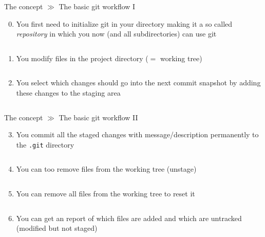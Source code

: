 \documentclass[10pt]{beamer}
\begin{document}
\begin{frame}{The concept $\gg$ The basic git workflow I}
	\begin{enumerate}\setcounter{enumi}{-1}
		\item You first need to initialize git in your directory making it a so called \textit{repository} in which you now (and all subdirectories) can use git
		\inputminted[bgcolor=lightGreyCustom,fontsize=\scriptsize]{sh}{./resources/git_workflow_00_init.sh}
		\item You modify files in the project directory ($=$ working tree)
		\inputminted[bgcolor=lightGreyCustom,fontsize=\scriptsize]{sh}{./resources/git_workflow_01_modify.sh}
		\item You select which changes should go into the next commit snapshot by adding these changes to the staging area
		\inputminted[bgcolor=lightGreyCustom,fontsize=\scriptsize]{sh}{./resources/git_workflow_02_stage.sh}
	\end{enumerate}
\end{frame}

\begin{frame}{The concept $\gg$ The basic git workflow II}
	\begin{enumerate}\setcounter{enumi}{2}
		\item You commit all the staged changes with message/description permanently to the \texttt{.git} directory
		\inputminted[bgcolor=lightGreyCustom,fontsize=\scriptsize]{sh}{./resources/git_workflow_03_commit.sh}
		\item You can too remove files from the working tree (unstage)
		\inputminted[bgcolor=lightGreyCustom,fontsize=\scriptsize]{sh}{./resources/git_workflow_04_unstage.sh}
		\item You can remove all files from the working tree to reset it
		\inputminted[bgcolor=lightGreyCustom,fontsize=\scriptsize]{sh}{./resources/git_workflow_05_reset.sh}
		\item You can get an report of which files are added and which are untracked (modified but not staged)
		\inputminted[bgcolor=lightGreyCustom,fontsize=\scriptsize]{sh}{./resources/git_workflow_06_status.sh}
	\end{enumerate}
\end{frame}
\end{document}
